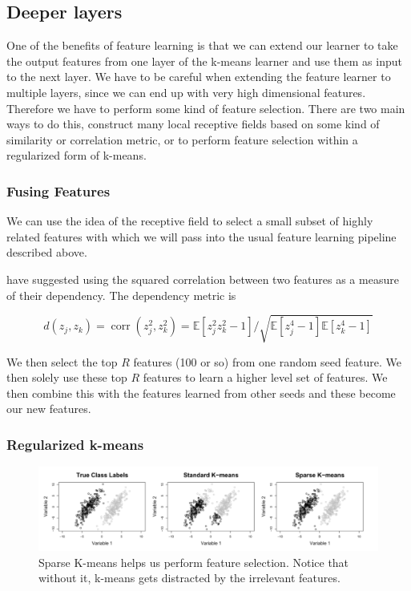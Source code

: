 \documentclass{article} %
\DeclareMathOperator{\corr}{corr}
\begin{document}
\subsection{Deeper layers}

One of the benefits of feature learning is that we can extend our learner to take the output features from one layer of the k-means learner and use them as input to the next layer. We have to be careful when extending the feature learner to multiple layers, since we can end up with very high dimensional features. Therefore we have to perform some kind of feature selection. There are two main ways to do this, construct many local receptive fields based on some kind of similarity or correlation metric, or to perform feature selection within a regularized form of k-means.

\subsubsection{Fusing Features}

We can use the idea of the receptive field \cite{barrow87} to select a small subset of highly related features with which we will pass into the usual feature learning pipeline described above.

\cite{coates} have suggested using the squared correlation between two features as a measure of their dependency. The dependency metric is

\begin{equation}
d(z_j, z_k) = \corr(z_j^2, z_k^2) = \mathbb{E}[z_j^2z_k^2-1]/\sqrt{\mathbb{E}[z_j^4 - 1]\mathbb{E}[z_k^4-1]}
\end{equation}

We then select the top $R$ features (100 or so) from one random seed feature. We then solely use these top $R$ features to learn a higher level set of features. We then combine this with the features learned from other seeds and these become our new features.

\subsubsection{Regularized k-means}

\begin{figure}
  \includegraphics[width=\columnwidth]{./images/sparse.png}
  \caption{Sparse K-means helps us perform feature selection. Notice that without it, k-means gets distracted by the irrelevant features.}
  \label{figSparseKM}
\end{figure}
\end{document}
